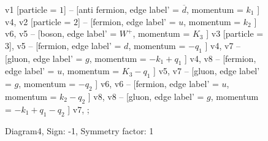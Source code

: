 \documentclass{revtex4}
\begin{document}
\begin{figure}[!htb]
\begin{center}
{    %
v1 [particle = \(1\)] -- [anti fermion, edge label' = \(\overline{d}\), momentum = \(k_{1}\) ] v4, 
v2 [particle = \(2\)] -- [fermion, edge label' = \(u\), momentum = \(k_{2}\) ] v6, 
v5 -- [boson, edge label' = \(W^{+}\), momentum = \(K_{3}\) ] v3 [particle = \(3\)], 
v5 -- [fermion, edge label' = \(d\), momentum = \(-q_{1}\) ] v4, 
v7 -- [gluon, edge label' = \(g\), momentum = \(-k_{1} + q_{1}\) ] v4, 
v8 -- [fermion, edge label' = \(u\), momentum = \(K_{3} - q_{1}\) ] v5, 
v7 -- [gluon, edge label' = \(g\), momentum = \(-q_{2}\) ] v6, 
v6 -- [fermion, edge label' = \(u\), momentum = \(k_{2} - q_{2}\) ] v8, 
v8 -- [gluon, edge label' = \(g\), momentum = \(-k_{1} + q_{1} - q_{2}\) ] v7, 
};
\end{center}
\caption{Diagram4, Sign: -1, Symmetry factor: 1}
\end{figure}
\newpage
\end{document}
